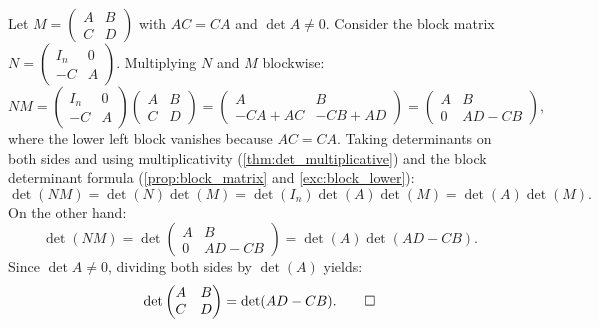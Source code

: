 \begin{exercisesolution}
\label{sol:block_matrix_commuting_blocks}
Let $M = \left(\begin{smallmatrix} A & B \\ C & D \end{smallmatrix}\right)$ with $AC = CA$ and $\det A \ne 0$.
Consider the block matrix $N = \left(\begin{smallmatrix} I_n & 0 \\ -C & A \end{smallmatrix}\right)$.
Multiplying $N$ and $M$ blockwise:
\[
NM = \begin{pmatrix} I_n & 0 \\ -C & A \end{pmatrix} \begin{pmatrix} A & B \\ C & D \end{pmatrix} = \begin{pmatrix} A & B \\ -CA + AC & -CB + AD \end{pmatrix} = \begin{pmatrix} A & B \\ 0 & AD - CB \end{pmatrix},
\]
where the lower left block vanishes because $AC = CA$.
Taking determinants on both sides and using multiplicativity (\cref{thm:det_multiplicative}) and the block determinant formula (\cref{prop:block_matrix} and \cref{exc:block_lower}):
\[
\det(NM) = \det(N) \det(M) = \det(I_n) \det(A) \det(M) = \det(A) \det(M).
\]
On the other hand:
\[
\det(NM) = \det \begin{pmatrix} A & B \\ 0 & AD - CB \end{pmatrix} = \det(A) \det(AD - CB).
\]
Since $\det A \ne 0$, dividing both sides by $\det(A)$ yields:
\[
\det \begin{pmatrix} A & B \\ C & D \end{pmatrix} = \det(AD - CB). \qedhere
\]
\end{exercisesolution}

